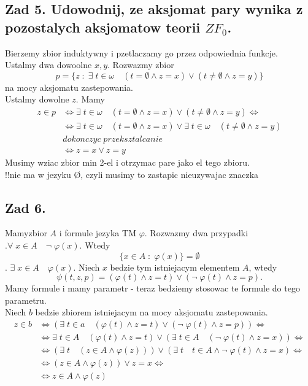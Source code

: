 \documentclass{article}
\begin{document}
\subsection*{Zad 5. Udowodnij, ze aksjomat pary wynika z pozostalych aksjomatow teorii $ZF_0$.}
    Bierzemy zbior induktywny i pzetlaczamy go przez odpowiednia funkcje.\medskip\\
    Ustalmy dwa dowoolne $x,y$. Rozwazmy zbior
    $$p=\{z\;:\;\exists\;t\in\omega\quad(t=\emptyset\land z=x)\lor(t\neq \emptyset\land z=y)\}$$
    na mocy aksjomatu zastepowania.\smallskip\\
    Ustalmy dowolne $z$. Mamy 
    \begin{align*}
        z\in p&\iff\exists\;t\in\omega\quad(t=\emptyset\land z=x)\lor(t\neq \emptyset\land z=y)\iff\\
        &\iff\exists\;t\in\omega\quad(t=\emptyset\land z=x)\lor\exists\;t\in \omega\quad (t\neq \emptyset\land z=y)\\
        &dokonczyc\;przeksztalcanie\\
        &\iff z=x\lor z=y
    \end{align*}
    Musimy wziac zbior min 2-el i otrzymac pare jako el tego zbioru.\smallskip\\
    !!nie ma w jezyku \O, czyli musimy to zastapic nieuzywajac znaczka
\subsection*{Zad 6.}
    Mamyzbior $A$ i formule jezyka TM $\varphi$. Rozwazmy dwa przypadki\medskip\\
    .$\forall\;x\in A\quad \neg\;\varphi(x)$. Wtedy
    $$\{x\in A\;:\;\varphi(x)\}=\emptyset$$
    . $\exists\;x\in A\quad \varphi(x)$. Niech $x$ bedzie tym istniejacym elementem $A$, wtedy
    $$\psi(t,z,p)=(\varphi(t)\land z=t)\lor(\neg\;\varphi(t)\land z=p).$$
    Mamy formule i mamy parametr - teraz bedziemy stosowac te formule do tego parametru.\medskip\\
    Niech $b$ bedzie zbiorem istniejacym na mocy aksjomatu zastepowania.
    \begin{align*}
        z\in b&\iff (\exists\;t\in a\quad (\varphi(t)\land z=t)\lor(\neg\;\varphi(t)\land z=p))\iff\\
        &\iff\exists\;t\in A\quad (\varphi(t)\land z=t)\lor(\exists\;t\in A\quad(\neg\;\varphi(t)\land z=x))\iff\\
        &\iff(\exists\;t\quad (z\in A\land \varphi(z)))\lor(\exists\;t\quad t\in A\land\neg\;\varphi(t)\land z=x)\iff\\
        &\iff (z\in A\land\varphi(z))\lor z=x\iff\\
        &\iff z\in A\land \varphi(z)
    \end{align*}
\end{document}

